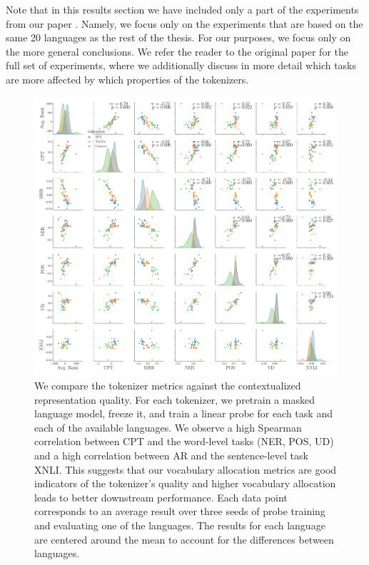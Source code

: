 Note that in this results section we have included only a part of the experiments from our paper \citet{limisiewicz_tokenization_2023}. Namely, we focus only on the experiments that are based on the same 20 languages as the rest of the thesis. For our purposes, we focus only on the more general conclusions. We refer the reader to the original paper for the full set of experiments, where we additionally discuss in more detail which tasks are more affected by which properties of the tokenizers.



\begin{figure}[H]
    \centering
    \includegraphics[width=\textwidth]{paper/figures/pair_analysis_20L.pdf}
    \caption{We compare the tokenizer metrics against the contextualized representation quality. For each tokenizer, we pretrain a masked language model, freeze it, and train a linear probe for each task and each of the available languages. We observe a high Spearman correlation between CPT and the word-level tasks (NER, POS, UD) and a high correlation between AR and the sentence-level task XNLI. This suggests that our vocabulary allocation metrics are good indicators of the tokenizer's quality and higher vocabulary allocation leads to better downstream performance. Each data point corresponds to an average result over three seeds of probe training and evaluating one of the languages. The results for each language are centered around the mean to account for the differences between languages.}
    \label{fig:pair_analysis_20L}
\end{figure}

